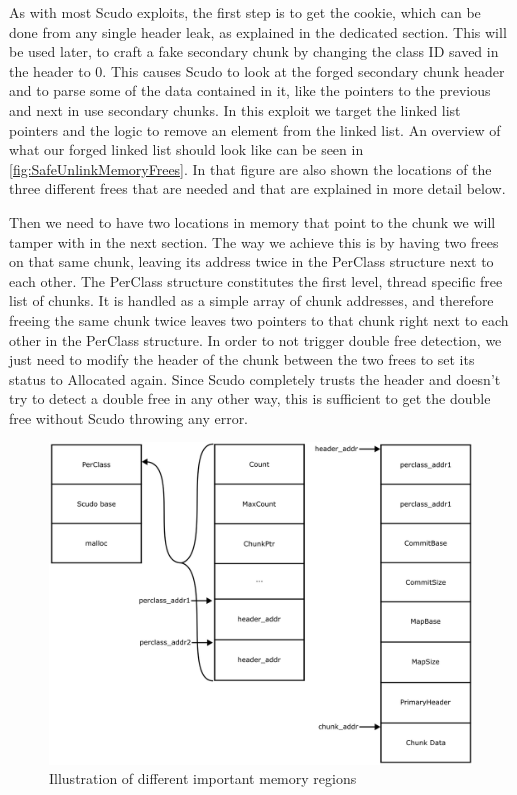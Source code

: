 \documentclass[a4paper,11pt,oneside]{report}
\begin{document}
As with most Scudo exploits, the first step is to get the cookie, which can be done from
any single header leak, as explained in the dedicated section. This will be used later,
to craft a fake secondary chunk by changing the class ID saved in the header to 0. This
causes Scudo to look at the forged secondary chunk header and to parse some of the data
contained in it, like the pointers to the previous and next in use secondary chunks. In
this exploit we target the linked list pointers and the logic to remove an element from
the linked list. An overview of what our forged linked list should look like can be seen
in \autoref{fig:SafeUnlinkMemoryFrees}. In that figure are also shown the locations of the
three different frees that are needed and that are explained in more detail below.

Then we need to have two locations in memory that point to the chunk we will tamper with
in the next section. The way we achieve this is by having two frees on that same chunk,
leaving its address twice in the PerClass structure next to each other. The PerClass
structure constitutes the first level, thread specific free list of chunks. It is handled
as a simple array of chunk addresses, and therefore freeing the same chunk twice leaves
two pointers to that chunk right next to each other in the PerClass structure. In order to
not trigger double free detection, we just need to modify the header of the chunk between
the two frees to set its status to Allocated again. Since Scudo completely trusts the
header and doesn't try to detect a double free in any other way, this is sufficient to get
the double free without Scudo throwing any error.

\begin{figure}[h!]
  \centering
  \includegraphics[width=\linewidth]{figures/SafeUnlinkMemory.png}
  \caption{Illustration of different important memory regions}\label{fig:SafeUnlinkMemory}
\end{figure}
\end{document}
